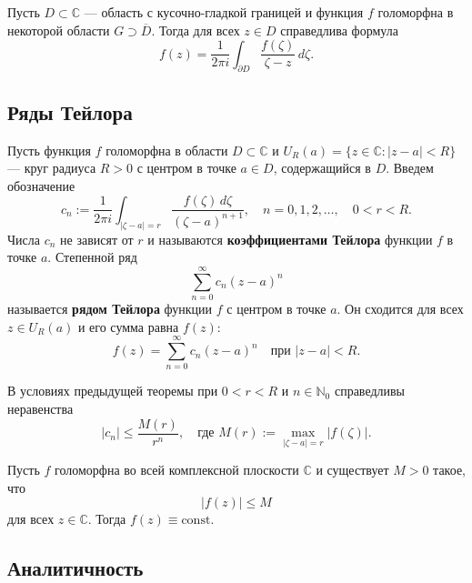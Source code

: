\begin{theorem}
Пусть $D \subset \mathbb{C}$ --- область с кусочно-гладкой границей и функция $f$ голоморфна в некоторой области $G \supset \overline{D}$. Тогда для всех $z \in D$ справедлива формула
\[
f(z) = \frac{1}{2\pi i} \int_{\partial D} \frac{f(\zeta)}{\zeta - z} \, d\zeta.
\]
\end{theorem}

\subsection{Ряды Тейлора}

\begin{theorem}[Тейлора]
Пусть функция $f$ голоморфна в области $D \subset \mathbb{C}$ и $U_R(a) = \{ z \in \mathbb{C} : |z - a| < R \}$ — круг радиуса $R > 0$ с центром в точке $a \in D$, содержащийся в $D$. Введем обозначение
\[
c_n := \frac{1}{2\pi i} \int_{|\zeta - a| = r} \frac{f(\zeta) \, d\zeta}{(\zeta - a)^{n+1}}, \quad n = 0, 1, 2, \dots, \quad 0 < r < R.
\]
Числа $c_n$ не зависят от $r$ и называются \textbf{коэффициентами Тейлора} функции $f$ в точке $a$. Степенной ряд
\[
\sum_{n=0}^{\infty} c_n (z - a)^n
\]
называется \textbf{рядом Тейлора} функции $f$ с центром в точке $a$. Он сходится для всех $z \in U_R(a)$ и его сумма равна $f(z)$:
\[
f(z) = \sum_{n=0}^{\infty} c_n (z - a)^n \quad \text{при } |z - a| < R.
\]
\end{theorem}

\begin{theorem}
В условиях предыдущей теоремы при $0 < r < R$ и $n \in\mathbb{N}_0$ справедливы неравенства
\[
|c_n| \leq \frac{M(r)}{r^n}, \quad \text{где } M(r) := \max_{|\zeta-a|=r} |f(\zeta)|.
\]
\end{theorem}

\begin{theorem}[Лиувилля]
Пусть $f$ голоморфна во всей комплексной плоскости $\mathbb{C}$ и существует $M > 0$ такое, что
\[
|f(z)| \leq M
\]
для всех $z \in \mathbb{C}$.
Тогда $f(z) \equiv \text{const}$.
\end{theorem}

\subsection{Аналитичность}

